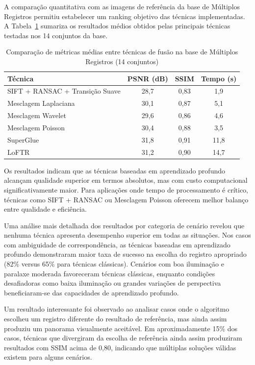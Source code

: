 A comparação quantitativa com as imagens de referência da base de Múltiplos Registros permitiu estabelecer um ranking objetivo das técnicas implementadas. A Tabela~\ref{tab:ranking_tecnicas} sumariza os resultados médios obtidos pelas principais técnicas testadas nos 14 conjuntos da base.

\begin{table}[htb]
\centering
\caption{Comparação de métricas médias entre técnicas de fusão na base de Múltiplos Registros (14 conjuntos)}
\label{tab:ranking_tecnicas}
\begin{tabular}{lccc}
\hline
\textbf{Técnica} & \textbf{PSNR (dB)} & \textbf{SSIM} & \textbf{Tempo (s)} \\
\hline
SIFT + RANSAC + Transição Suave & 28,7 & 0,83 & 1,9 \\
Mesclagem Laplaciana & 30,1 & 0,87 & 5,1 \\
Mesclagem Wavelet & 29,6 & 0,86 & 4,6 \\
Mesclagem Poisson & 30,4 & 0,88 & 3,5 \\
SuperGlue & 31,8 & 0,91 & 11,8 \\
LoFTR & 31,2 & 0,90 & 14,7 \\
\hline
\end{tabular}
\end{table}

Os resultados indicam que as técnicas baseadas em aprendizado profundo alcançam qualidade superior em termos absolutos, mas com custo computacional significativamente maior. Para aplicações onde tempo de processamento é crítico, técnicas como SIFT + RANSAC ou Mesclagem Poisson oferecem melhor balanço entre qualidade e eficiência.

Uma análise mais detalhada dos resultados por categoria de cenário revelou que nenhuma técnica apresenta desempenho superior em todas as situações. Nos casos com ambiguidade de correspondência, as técnicas baseadas em aprendizado profundo demonstraram maior taxa de sucesso na escolha do registro apropriado (82\% versus 65\% para técnicas clássicas). Cenários com boa iluminação e paralaxe moderada favoreceram técnicas clássicas, enquanto condições desafiadoras como baixa iluminação ou grandes variações de perspectiva beneficiaram-se das capacidades de aprendizado profundo.

Um resultado interessante foi observado ao analisar casos onde o algoritmo escolheu um registro diferente do resultado de referência, mas ainda assim produziu um panorama visualmente aceitável. Em aproximadamente 15\% dos casos, técnicas que divergiram da escolha de referência ainda assim produziram resultados com SSIM acima de 0,80, indicando que múltiplas soluções válidas existem para alguns cenários.

